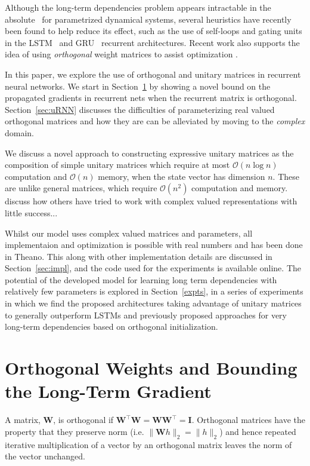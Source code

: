 \documentclass{article} %
\newcommand{\matr}[1]{\mathbf{#1}}
\begin{document}
Although the long-term dependencies problem appears intractable in the absolute~\citep{Yoshua94} for
parametrized dynamical systems, several heuristics have recently been found to help 
reduce its effect, such as the use of self-loops and gating units in the LSTM~\citep{LSTM}
and GRU~\citep{Cho2014a} recurrent architectures.
Recent work also supports the idea of using \textit{orthogonal} weight matrices to assist optimization  
\citep{Saxe2014, Quoc2015}.


In this paper, we explore the use of orthogonal and unitary matrices in recurrent neural networks.
We start in Section~\ref{sec:ortho} by showing a novel bound on the propagated gradients
in recurrent nets when the recurrent matrix is orthogonal.
Section~\ref{sec:uRNN} discusses the difficulties of parameterizing real valued orthogonal matrices and how
they are can be alleviated by moving to the \textit{complex} domain. 

We discuss a novel approach to constructing expressive unitary matrices as the composition of simple
unitary matrices which require at most $\mathcal{O}(n \log n)$ computation and $\mathcal{O}(n)$ memory,
when the state vector has dimension $n$. These are
unlike general matrices, which require $\mathcal{O}(n^2)$ computation and memory. {\color{red} discuss how 
others have tried to work with complex valued representations with little success... }

Whilst our model uses complex valued matrices and parameters, all
implementaion and optimization is possible with real numbers and has been
done in Theano. This along with other implementation details are discussed
in Section~\ref{sec:impl}, and the code used for the experiments is available online.
The potential of the developed model for learning long term dependencies
with relatively few parameters is explored in Section~\ref{expts}, in a series of
experiments in which we find the proposed architectures taking advantage of
unitary matrices to generally outperform LSTMs and previously proposed
approaches for very long-term dependencies based on orthogonal
initialization.

\section{Orthogonal Weights and Bounding the Long-Term Gradient}
\label{sec:ortho}

A matrix, $\matr{W}$, is orthogonal if 
$\matr{W}^\top \matr{W} = \matr{W} \matr{W}^\top = \matr{I}$. 
Orthogonal matrices have the property that they preserve norm (i.e. $\| \matr{W} h \|_2 = \| h \|_2$)
and hence repeated iterative multiplication of a vector by an orthogonal matrix leaves the norm of the 
vector unchanged.
\end{document}
